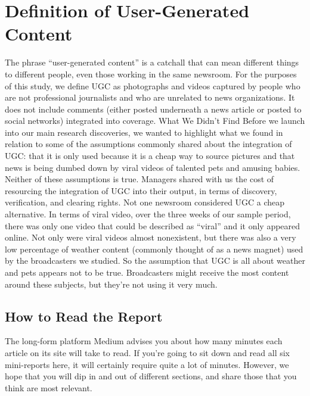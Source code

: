 \documentclass[symmetric, notoc, nobib]{towcenter-book}
\begin{document}
\chapter{Definition of User-Generated Content}
The phrase ``user-generated content'' is a catchall that can mean different
things to different people, even those working in the same newsroom. For
the purposes of this study, we define UGC as photographs and videos captured
by people who are not professional journalists and who are unrelated
to news organizations. It does not include comments (either posted underneath
a news article or posted to social networks) integrated into coverage.
What We Didn't Find
Before we launch into our main research discoveries, we wanted to highlight
what we found in relation to some of the assumptions commonly shared
about the integration of UGC: that it is only used because it is a cheap way
to source pictures and that news is being dumbed down by viral videos of
talented pets and amusing babies.
Neither of these assumptions is true. Managers shared with us the cost of
resourcing the integration of UGC into their output, in terms of discovery,
verification, and clearing rights. Not one newsroom considered UGC a
cheap alternative.
In terms of viral video, over the three weeks of our sample period, there
was only one video that could be described as ``viral'' and it only appeared
online. Not only were viral videos almost nonexistent, but there was also a
very low percentage of weather content (commonly thought of as a news
magnet) used by the broadcasters we studied. So the assumption that UGC
is all about weather and pets appears not to be true. Broadcasters might
receive the most content around these subjects, but they're not using it
very much.

\section{How to Read the Report}
The long-form platform Medium advises you about how many minutes each
article on its site will take to read. If you're going to sit down and read all six
mini-reports here, it will certainly require quite a lot of minutes. However,
we hope that you will dip in and out of different sections, and share those
that you think are most relevant.
\end{document}
